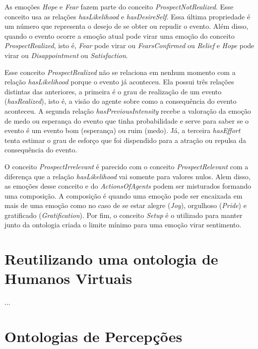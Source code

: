 As emoções \emph{Hope} e \emph{Fear} fazem parte do conceito
\emph{ProspectNotRealized}. Esse conceito usa as relações \emph{hasLikelihood}
e \emph{hasDesireSelf}. Essa última propriedade é um número que
representa o desejo de se obter ou repudir o evento. Além disso, quando o
evento ocorre a emoção atual pode virar uma emoção do conceito
\emph{ProspectRealized}, isto é, \emph{Fear} pode virar ou
\emph{FearsConfirmed} ou \emph{Relief} e \emph{Hope} pode virar ou
\emph{Disappointment} ou \emph{Satisfaction}.

Esse conceito \emph{ProspectRealized} não se relaciona em nenhum momento com a
relação \emph{hasLikelihood} porque o evento já aconteceu. Ela possui três
relações distintas das anteriores, a primeira é o grau de realização de um evento
(\emph{hasRealized}), isto é, a visão do agente sobre como a consequência do
evento aconteceu. A segunda relação \emph{hasPreviousIntensity} recebe a
valoração da emoção de medo ou esperança do evento que tinha probabilidade e
serve para saber se o evento é um evento bom (esperança) ou ruim (medo). Já, a
terceira \emph{hasEffort} tenta estimar o grau de esforço que foi dispendido
para a atração ou repulsa da consequência do evento.

O conceito \emph{ProspectIrrelevant} é parecido com o conceito
\emph{ProspectRelevant} com a diferença que a relação \emph{hasLikelihood} vai
somente para valores nulos. Alem disso, as emoções desse conceito e do
\emph{ActionsOfAgents} podem ser misturados formando uma composição. A
composição é quando uma emoção pode ser encaixada em mais de uma emoção como
no caso de se estar alegre (\emph{Joy}), orgulhoso (\emph{Pride}) e
gratificado (\emph{Gratification}). Por fim, o conceito \emph{Setup}
 é o
utilizado para manter junto da ontologia criada o limite mínimo para uma
emoção virar sentimento\dev{}.


\section{Reutilizando uma ontologia de Humanos Virtuais} \label{cap:tp:ruodhv}

...

\section{Ontologias de Percepções} \label{cap:tp:odp}

